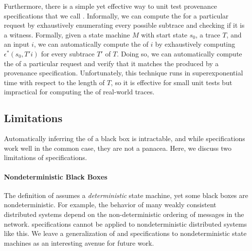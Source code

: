 Furthermore, there is a simple yet effective way to unit test provenance
specifications that we call .
Informally, we can compute the \watprovenance{} for a particular request by
exhaustively enumerating every possible subtrace and checking if it is a
witness. Formally, given a state machine $M$ with start state $s_0$, a trace
$T$, and an input $i$, we can automatically compute the \watprovenance{} of $i$
by exhaustively computing $\epsilon^*(s_0, T'i)$ for every subtrace $T'$ of
$T$. Doing so, we can automatically compute the \watprovenance{} of a
particular request and verify that it matches the \watprovenance{} produced by
a provenance specification. Unfortunately, this technique runs in
superexponential time with respect to the length of $T$, so it is effective for
small unit tests but impractical for computing the \watprovenance{} of
real-world traces.

\subsection{Limitations}
Automatically inferring the \watprovenance{} of a black box is intractable, and
while \watprovenance{} specifications work well in the common case, they are
not a panacea. Here, we discuss two limitations of \watprovenance{}
specifications.

\paragraph{Nondeterministic Black Boxes}
The definition of \watprovenance{} assumes a \emph{deterministic} state
machine, yet some black boxes are nondeterministic. For example, the behavior
of many weakly consistent distributed systems depend on the non-deterministic
ordering of messages in the network. \Watprovenance{} specifications cannot be
applied to nondeterministic distributed systems like this. We leave a
generalization of \watprovenance{} and \watprovenance{} specifications to
nondeterministic state machines as an interesting avenue for future work.


